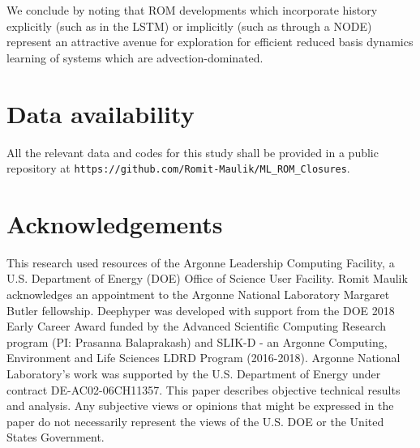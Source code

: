 \documentclass[preprint,12pt]{elsarticle}
\begin{document}
We conclude by noting that ROM developments which incorporate history explicitly (such as in the LSTM) or implicitly (such as through a NODE) represent an attractive avenue for exploration for efficient reduced basis dynamics learning of systems which are advection-dominated.

\section{Data availability}

All the relevant data and codes for this study shall be provided in a public repository at \texttt{https://github.com/Romit-Maulik/ML\_ROM\_Closures}.

\section{Acknowledgements}

This research used resources of the Argonne Leadership Computing Facility, a U.S. Department of Energy (DOE) Office of Science User Facility. Romit Maulik acknowledges an appointment to the Argonne National Laboratory Margaret Butler fellowship. Deephyper was developed with support from the DOE 2018 Early Career Award funded by the Advanced Scientific Computing Research program (PI: Prasanna Balaprakash) and SLIK-D - an Argonne Computing, Environment and Life Sciences LDRD Program (2016-2018). Argonne National Laboratory's work was supported by the U.S. Department of Energy under contract DE-AC02-06CH11357. This paper describes objective technical results and analysis. Any subjective views or opinions that might be expressed in the paper do not necessarily represent the views of the U.S. DOE or the United States Government.













\end{document}
